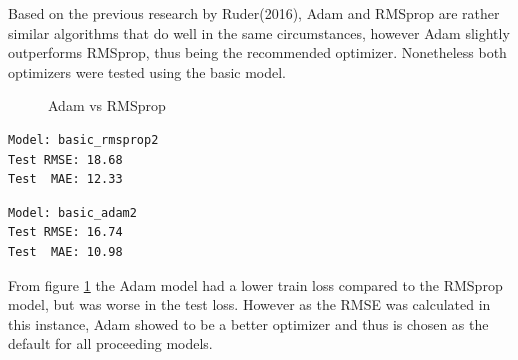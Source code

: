\documentclass[10pt,11pt,12pt,oneside]{book}
\begin{document}
Based on the previous research by Ruder(2016), Adam
and RMSprop are rather similar algorithms that do well in the same circumstances, however Adam slightly outperforms RMSprop, thus being the recommended optimizer. \cite{DBLP:journals/corr/Ruder16} Nonetheless both optimizers were tested using the basic model.
\begin{figure}[H]
    \centering
    \qquad
    \caption{Adam vs RMSprop}%
    \label{fig:basic}%
\end{figure}
\pagebreak
\begin{multicols}{2}
\centering
\begin{verbatim}
Model: basic_rmsprop2
Test RMSE: 18.68
Test  MAE: 12.33
\end{verbatim}
\begin{verbatim}
Model: basic_adam2
Test RMSE: 16.74
Test  MAE: 10.98
\end{verbatim}
\end{multicols}
From figure \ref{fig:basic} the Adam model had a lower train loss compared to the RMSprop model, but was worse in the test loss. However as the RMSE was calculated in this instance, Adam showed to be a better optimizer and thus is chosen as the default for all proceeding models.\\
\end{document}
